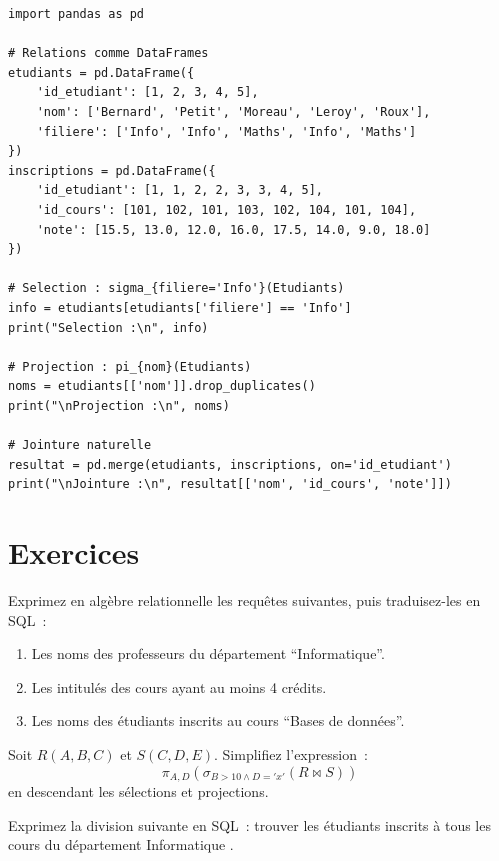 \begin{codeblock}[title=\textbf{Simulation de l'alg\`ebre relationnelle avec pandas}]
\begin{verbatim}
import pandas as pd

# Relations comme DataFrames
etudiants = pd.DataFrame({
    'id_etudiant': [1, 2, 3, 4, 5],
    'nom': ['Bernard', 'Petit', 'Moreau', 'Leroy', 'Roux'],
    'filiere': ['Info', 'Info', 'Maths', 'Info', 'Maths']
})
inscriptions = pd.DataFrame({
    'id_etudiant': [1, 1, 2, 2, 3, 3, 4, 5],
    'id_cours': [101, 102, 101, 103, 102, 104, 101, 104],
    'note': [15.5, 13.0, 12.0, 16.0, 17.5, 14.0, 9.0, 18.0]
})

# Selection : sigma_{filiere='Info'}(Etudiants)
info = etudiants[etudiants['filiere'] == 'Info']
print("Selection :\n", info)

# Projection : pi_{nom}(Etudiants)
noms = etudiants[['nom']].drop_duplicates()
print("\nProjection :\n", noms)

# Jointure naturelle
resultat = pd.merge(etudiants, inscriptions, on='id_etudiant')
print("\nJointure :\n", resultat[['nom', 'id_cours', 'note']])
\end{verbatim}
\end{codeblock}

\section*{Exercices}

\begin{exercice}
Exprimez en alg\`ebre relationnelle les requ\^etes suivantes, puis traduisez-les en SQL~:
\begin{enumerate}
    \item Les noms des professeurs du d\'epartement ``Informatique''.
    \item Les intitul\'es des cours ayant au moins 4 cr\'edits.
    \item Les noms des \'etudiants inscrits au cours ``Bases de donn\'ees''.
\end{enumerate}
\end{exercice}

\begin{exercice}
Soit $R(A, B, C)$ et $S(C, D, E)$. Simplifiez l'expression~:
\[
\pi_{A, D}(\sigma_{B > 10 \land D = 'x'}(R \bowtie S))
\]
en descendant les s\'elections et projections.
\end{exercice}

\begin{exercice}
Exprimez la division suivante en SQL~: \og trouver les \'etudiants inscrits
\`a tous les cours du d\'epartement Informatique \fg.
\end{exercice}

